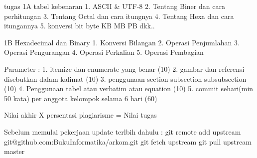 tugas
1A
tabel kebenaran
1. ASCII & UTF-8
2. Tentang Biner dan cara perhitungan
3. Tentang Octal dan cara itungnya
4. Tentang Hexa dan cara itungannya
5. konversi bit byte KB MB PB dkk..
 

1B 
Hexadecimal dan Binary
1. Konversi Bilangan
2. Operasi Penjumlahan
3. Operasi Pengurangan
4. Operasi Perkalian
5. Operasi Pembagian

Parameter :
1. itemize dan enumerate yang benar (10)
2. gambar dan referensi disebutkan dalam kalimat (10)
3. penggunaan section subsection subsubsection (10)
4. Penggunaan tabel atau verbatim atau equation (10)
5. commit sehari(min 50 kata) per anggota kelompok selama 6 hari (60)

Nilai akhir X persentasi plagiarisme = Nilai tugas

Sebelum memulai pekerjaan update terlbih dahulu :
git remote add upstream git@github.com:BukuInformatika/arkom.git
git fetch upstream
git pull upstream master